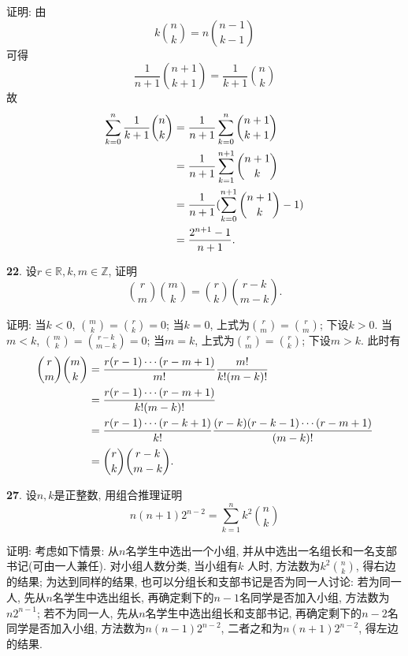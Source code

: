 \par 证明: 由
\begin{displaymath}
k\binom{n}{k}=n\binom{n-1}{k-1}
\end{displaymath}
可得
\begin{displaymath}
\frac{1}{n+1}\binom{n+1}{k+1}=\frac{1}{k+1}\binom{n}{k}
\end{displaymath}
故
\begin{align*}
\sum_{k=0}^n \frac{1}{k+1}\binom{n}{k}
&=\frac{1}{n+1}\sum^{n}_{k=0}\binom{n+1}{k+1}\notag\\
&=\frac{1}{n+1}\sum^{n+1}_{k=1}\binom{n+1}{k}\notag\\
&=\frac{1}{n+1}(\sum^{n+1}_{k=0}\binom{n+1}{k}-1)\notag\\
&=\frac{2^{n+1}-1}{n+1}. \notag
\end{align*}

\par \textbf{22}. 设$r\in\mathbb{R},k,m\in\mathbb{Z}$, 证明
\begin{displaymath}
\binom{r}{m}\binom{m}{k}=\binom{r}{k}\binom{r-k}{m-k}.
\end{displaymath}
\par 证明: 当$k<0$, $\binom{m}{k}=\binom{r}{k}=0$;
当$k=0$, 上式为$\binom{r}{m}=\binom{r}{m}$; 下设$k>0$.
当$m<k$, $\binom{m}{k}=\binom{r-k}{m-k}=0$;
当$m=k$, 上式为$\binom{r}{m}=\binom{r}{k}$; 下设$m>k$.
此时有
\begin{align*}
\binom{r}{m}\binom{m}{k}
&=\frac{r(r-1)\cdots(r-m+1)}{m!}\frac{m!}{k!(m-k)!}\notag\\
&=\frac{r(r-1)\cdots(r-m+1)}{k!(m-k)!}\notag\\
&=\frac{r(r-1)\cdots(r-k+1)}{k!}\frac{(r-k)(r-k-1)\cdots(r-m+1)}{(m-k)!}\notag\\
&=\binom{r}{k}\binom{r-k}{m-k}. \notag
\end{align*}

\par \textbf{27}. 设$n,k$是正整数, 用组合推理证明
\begin{displaymath}
n(n+1)2^{n-2}=\sum_{k=1}^n k^2\binom{n}{k}
\end{displaymath}
\par 证明: 考虑如下情景: 从$n$名学生中选出一个小组, 并从中选出一名组长和一名支部书记(可由一人兼任). 对小组人数分类, 当小组有$k$ 人时, 方法数为$k^2\binom{n}{k}$, 得右边的结果; 为达到同样的结果, 也可以分组长和支部书记是否为同一人讨论: 若为同一人, 先从$n$名学生中选出组长, 再确定剩下的$n-1$名同学是否加入小组, 方法数为$n2^{n-1}$; 若不为同一人, 先从$n$名学生中选出组长和支部书记, 再确定剩下的$n-2$名同学是否加入小组, 方法数为$n(n-1)2^{n-2}$, 二者之和为$n(n+1)2^{n-2}$, 得左边的结果.

